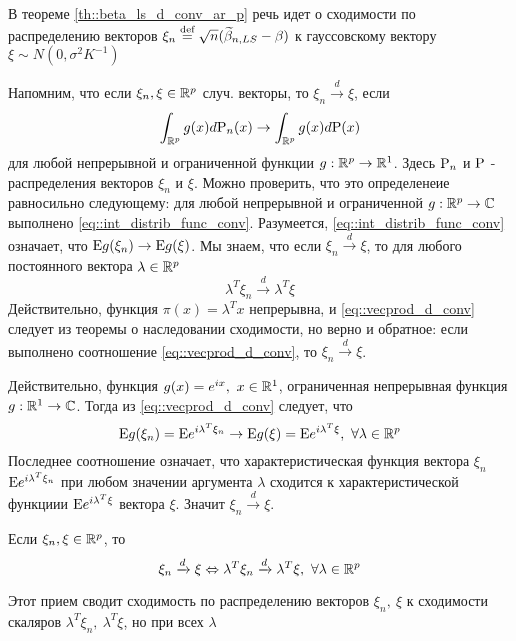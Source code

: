 \begin{remark}
    В теореме \ref{th::beta_ls_d_conv_ar_p} речь идет о сходимости по распределению векторов
    $\xi_n\defeq \sqrt{n}(\widetilde{\beta}_{n,LS}-\beta)$ к гауссовскому вектору $\xi\sim N(0,\sigma^2K^{-1})$

    Напомним, что если $\xi_n,\xi\in\R^p$ случ. векторы, то $\xi_n\xrightarrow{d}\xi$, если
    \begin{equation} \label{eq::int_distrib_func_conv}
        \int_{\R^p}g(x)d\P_n(x)\rightarrow\int_{\R^p}g(x)d\P(x)
    \end{equation}
    для любой непрерывной и ограниченной функции $g:\R^p\rightarrow\R^1$. Здесь $\P_n$ и $\P$ - 
    распределения векторов $\xi_n$ и $\xi$. Можно проверить, что это определенеие равносильно
    следующему: для любой непрерывной и ограниченной $g:\R^p\rightarrow\C$ выполнено \eqref{eq::int_distrib_func_conv}.
    Разумеется, \eqref{eq::int_distrib_func_conv} означает, что $\E g(\xi_n)\rightarrow\E g(\xi)$.
    Мы знаем, что если $\xi_n\xrightarrow{d}\xi$, то для любого постоянного вектора $\lambda\in\R^p$
    \begin{equation}\label{eq::vecprod_d_conv}
        \lambda^T\xi_n\xrightarrow{d}\lambda^T\xi
    \end{equation}
    Действительно, функция $\pi(x)=\lambda^Tx$ непрерывна, и \eqref{eq::vecprod_d_conv} следует из теоремы о наследовании
    сходимости, но верно и обратное: если выполнено соотношение \eqref{eq::vecprod_d_conv}, то $\xi_n\xrightarrow{d}\xi$.

    Действительно, функция $g(x)=e^{ix},\ x\in\R^1$, ограниченная непрерывная функция $g:\R^1\rightarrow\C$.
    Тогда из \eqref{eq::vecprod_d_conv} следует, что
    \[\E g(\xi_n)=\E e^{i\lambda^T\xi_n}\rightarrow\E g(\xi)=\E e^{i\lambda^T\xi},\ \forall\lambda\in\R^p\]
    Последнее соотношение означает, что характеристическая функция вектора $\xi_n$ $\E e^{i\lambda^T\xi_n}$
    при любом значении аргумента $\lambda$ сходится к характеристической функциии $\E e^{i\lambda^T\xi}$ вектора $\xi$.
    Значит $\xi_n\xrightarrow{d}\xi$.
    \begin{lemma}\label{lm::cramer_wold}
        Если $\xi_n,\xi\in\R^p$, то
        \[\xi_n\xrightarrow{d}\xi\Leftrightarrow\lambda^T\xi_n\xrightarrow{d}\lambda^T\xi,\ \forall\lambda\in\R^p\]
    \end{lemma}
    \begin{leftbar}
        Этот прием сводит сходимость по распределению векторов $\xi_n,\ \xi$ к сходимости скаляров $\lambda^T\xi_n,\ \lambda^T\xi$, но при
        всех $\lambda$
    \end{leftbar}
\end{remark}
